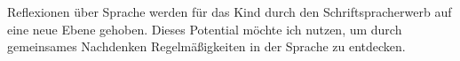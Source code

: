 Reflexionen über Sprache werden für das Kind durch den Schriftspracherwerb auf eine neue Ebene gehoben.
Dieses Potential möchte ich nutzen, um durch gemeinsames Nachdenken Regelmäßigkeiten in der Sprache zu entdecken.